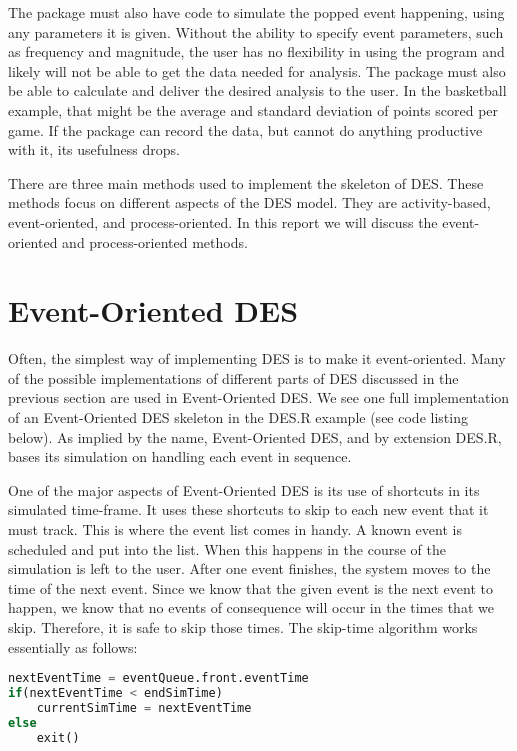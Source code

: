 \documentclass[a4paper, 11pt]{article} %
\begin{document}
The package must also have code to simulate the popped event happening, using any parameters it is given. Without the ability to specify event parameters, such as frequency and magnitude, the user has no flexibility in using the program and likely will not be able to get the data needed for analysis. The package must also be able to calculate and deliver the desired analysis to the user. In the basketball example, that might be the average and standard deviation of points scored per game. If the package can record the data, but cannot do anything productive with it, its usefulness drops.


There are three main methods used to implement the skeleton of DES. These methods focus on different aspects of the DES model. They are activity-based, event-oriented, and process-oriented. In this report we will discuss the event-oriented and process-oriented methods.




\section*{Event-Oriented DES}


Often, the simplest way of implementing DES is to make it event-oriented. Many of the possible implementations of different parts of DES discussed in the previous section are used in Event-Oriented DES. We see one full implementation of an Event-Oriented DES skeleton in the DES.R example (see code listing below). As implied by the name, Event-Oriented DES, and by extension DES.R, bases its simulation on handling each event in sequence. 


One of the major aspects of Event-Oriented DES is its use of shortcuts in its simulated time-frame. It uses these shortcuts to skip to each new event that it must track. This is where the event list comes in handy. A known event is scheduled and put into the list. When this happens in the course of the simulation is left to the user. After one event finishes, the system moves to the time of the next event. Since we know that the given event is the next event to happen, we know that no events of consequence will occur in the times that we skip. Therefore, it is safe to skip those times. The skip-time algorithm works essentially as follows: \pagebreak


\begin{lstlisting}[language=Python,caption=Skip Time Algorithm]
nextEventTime = eventQueue.front.eventTime
if(nextEventTime < endSimTime)
	currentSimTime = nextEventTime
else
	exit()
\end{lstlisting}
\end{document}
